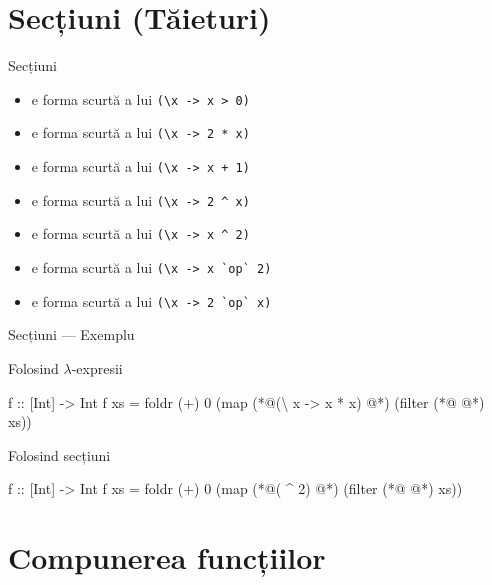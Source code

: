 \documentclass[xcolor=pdftex,romanian,colorlinks]{beamer}
\begin{document}
\section{Secțiuni (Tăieturi)}

\begin{frame}[fragile]{Secțiuni}
\begin{itemize}
\item {} e forma scurtă a lui \lstinline$(\x -> x > 0)$
\item {} e forma scurtă a lui \lstinline$(\x -> 2 * x)$
\item {} e forma scurtă a lui \lstinline$(\x -> x + 1)$
\item {} e forma scurtă a lui \lstinline$(\x -> 2 ^ x)$
\item {} e forma scurtă a lui \lstinline$(\x -> x ^ 2)$
\item<2>  e forma scurtă a lui \lstinline$(\x -> x `op` 2)$
\item<2>  e forma scurtă a lui \lstinline$(\x -> 2 `op` x)$
\end{itemize}
\end{frame}


\begin{frame}[fragile]{Secțiuni --- Exemplu}
\begin{block}{Folosind $\lambda$-expresii}
\begin{asciihs}
f :: [Int] -> Int
f xs = foldr (+) 0 
         (map (*@\color{blue}(\textbackslash\; x -> x * x) @*) 
            (filter (*@\color{blue}{(\textbackslash\; x -> x > 0)} @*) xs))
\end{asciihs}
\end{block}

\begin{block}{Folosind secțiuni}
\begin{asciihs}
f :: [Int] -> Int
f xs = foldr (+) 0 (map (*@\color{blue}( \^{} 2) @*) (filter (*@\color{blue}{( > 0)} @*) xs))
\end{asciihs}
\end{block}
\end{frame}

\section{Compunerea funcțiilor}
\end{document}

